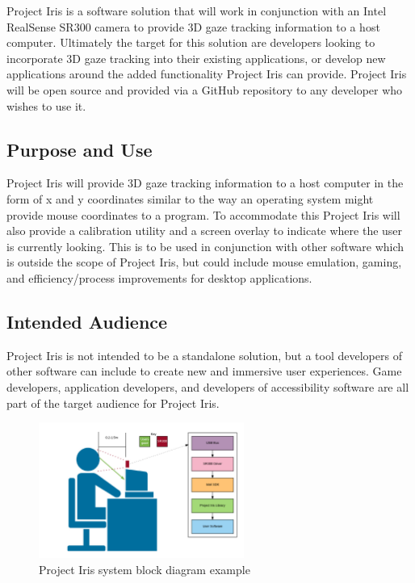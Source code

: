 Project Iris is a software solution that will work in conjunction with an Intel RealSense SR300 camera to provide 3D gaze tracking information to a host computer. Ultimately the target for this solution are developers looking to incorporate 3D gaze tracking into their existing applications, or develop new applications around the added functionality Project Iris can provide. Project Iris will be open source and provided via a GitHub repository to any developer who wishes to use it.

\subsection{Purpose and Use}
Project Iris will provide 3D gaze tracking information to a host computer in the form of x and y coordinates similar to the way an operating system might provide mouse coordinates to a program. To accommodate this Project Iris will also provide a calibration utility and a screen overlay to indicate where the user is currently looking. This is to be used in conjunction with other software which is outside the scope of Project Iris, but could include mouse emulation, gaming, and efficiency/process improvements for desktop applications.

\subsection{Intended Audience}
Project Iris is not intended to be a standalone solution, but a tool developers of other software can include to create new and immersive user experiences. Game developers, application developers, and developers of accessibility software are all part of the target audience for Project Iris.

\begin{figure}[h!]
	\centering
   	\includegraphics[width=0.60\textwidth]{images/project-iris-system-block}
    \caption{Project Iris system block diagram example}
\end{figure}
